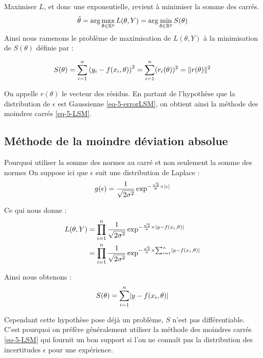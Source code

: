 		Maximiser $L$, et donc une exponentielle, revient à minimiser la somme des carrés.
		$$
			\hat\theta = \arg \max_{\theta \in \mathbb{R}^p} L(\theta,Y) = \arg \min_{\theta \in \mathbb{R}^p} S(\theta) 
		$$
		Ainsi nous ramenons le problème de maximisation de $L(\theta,Y)$ à la minimisation de $S(\theta)$ définie par :

		\begin{equation}
			\label{eq-5-LSM}
			S(\theta) = \sum_{i=1}^n \left( y_i - f(x_i, \theta)\right)^2 = \sum_{i=1}^n ( r_i(\theta) )^2 = \lVert r(\theta) \rVert^2
		\end{equation}

		On appelle $r(\theta)$ le vecteur des résidus.
		En partant de l'hypothèse que la distribution de $\epsilon$ est Gaussienne \eqref{eq-5-errorLSM}, on obtient ainsi la méthode des moindres carrés \eqref{eq-5-LSM}.


	\subsection{Méthode de la moindre déviation absolue}

		Pourquoi utiliser la somme des normes au carré et non seulement la somme des normes
		On suppose ici que $\epsilon$ suit une distribution de Laplace :
		\begin{equation}
			\label{eq-5-errorLADM}
			g(\epsilon) = \frac{1}{\sqrt{2 \sigma^2}} \exp^{-\frac{\sqrt{2}}{\sigma} \times \lvert \epsilon \rvert} 
		\end{equation}

		Ce qui nous donne :
		\begin{align*}
			L(\theta,Y) 	&= \prod_{i=1}^n \frac{1}{\sqrt{2 \sigma^2}} \exp^{-\frac{\sqrt{2}}{\sigma} \times \lvert y - f(x_i, \theta) \rvert}
			\\
			&= \prod_{i=1}^n \frac{1}{\sqrt{2 \sigma^2}} \exp^{-\frac{\sqrt{2}}{\sigma} \times \sum_{i=1}^n \lvert y - f(x_i, \theta) \rvert}
		\end{align*}

		Ainsi nous obtenons :
		\begin{equation}
			\label{eq-5-LADM}
			S(\theta) = \sum_{i=1}^n \lvert y - f(x_i, \theta) \rvert
		\end{equation}

		Cependant cette hypothèse pose déjà un problème, $S$ n'est pas différentiable.
		C'est pourquoi on préfère généralement utiliser la méthode des moindres carrés \eqref{eq-5-LSM} qui fournit un bon support si l'on ne connaît pas la distribution des incertitudes $\epsilon$ pour une expérience.

